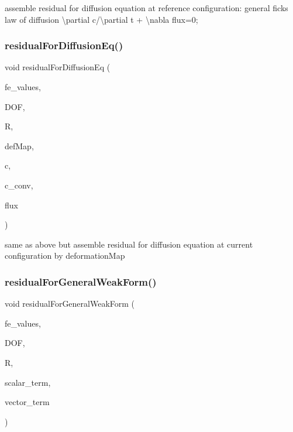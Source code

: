 assemble residual for diffusion equation at reference configuration\+: general fick\textquotesingle{}s law of diffusion \textbackslash{}partial c/\textbackslash{}partial t + \textbackslash{}nabla flux=0; \mbox{\label{class_residual_a69b8ab1cc85ae177f9c627b60b1b8468}} 
\subsubsection{\texorpdfstring{residualForDiffusionEq()}{residualForDiffusionEq()}\hspace{0.1cm}{\footnotesize\ttfamily [2/2]}}
{\footnotesize\ttfamily void residual\+For\+Diffusion\+Eq (\begin{DoxyParamCaption}\item[{const F\+E\+Values$<$ dim $>$ \&}]{fe\+\_\+values,  }\item[{unsigned int}]{D\+OF,  }\item[{dealii\+::\+Table$<$ 1, T $>$ \&}]{R,  }\item[{\mbox{\hyperlink{structdeformation_map}{deformation\+Map}}$<$ T, dim $>$ \&}]{def\+Map,  }\item[{dealii\+::\+Table$<$ 1, T $>$ \&}]{c,  }\item[{dealii\+::\+Table$<$ 1, double $>$ \&}]{c\+\_\+conv,  }\item[{dealii\+::\+Table$<$ 2, T $>$ \&}]{flux }\end{DoxyParamCaption})}

same as above but assemble residual for diffusion equation at current configuration by deformation\+Map \mbox{\label{class_residual_ab90bb5476a96c0e7098264562b313b7b}} 
\subsubsection{\texorpdfstring{residualForGeneralWeakForm()}{residualForGeneralWeakForm()}\hspace{0.1cm}{\footnotesize\ttfamily [1/2]}}
{\footnotesize\ttfamily void residual\+For\+General\+Weak\+Form (\begin{DoxyParamCaption}\item[{const F\+E\+Values$<$ dim $>$ \&}]{fe\+\_\+values,  }\item[{unsigned int}]{D\+OF,  }\item[{dealii\+::\+Table$<$ 1, T $>$ \&}]{R,  }\item[{dealii\+::\+Table$<$ 1, T $>$ \&}]{scalar\+\_\+term,  }\item[{dealii\+::\+Table$<$ 2, T $>$ \&}]{vector\+\_\+term }\end{DoxyParamCaption})}

